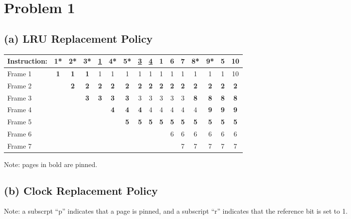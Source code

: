 \documentclass[a4paper, 12pt]{article}
\begin{document}
\section*{Problem 1}

\subsection*{(a) LRU Replacement Policy}

\begin{table}[h]
	\centering
	\begin{tabular}{l c c c c c c c c c c c c c c c}
		Instruction: & 1* & 2* & 3* & \underline{1} & 4* & 5* & \underline{3} &
		\underline{4} & 1 & 6 & 7 & 8* & 9* & 5 & 10 \\
		\hline
		Frame 1 & \textbf{1} & \textbf{1} & \textbf{1} & 1 & 1 & 1 & 1 & 1 & 1 &
		1 & 1 & 1 & 1 & 1 & 10 \\
		Frame 2 & & \textbf{2} & \textbf{2} & \textbf{2} & \textbf{2} &
		\textbf{2} & \textbf{2} & \textbf{2} & \textbf{2} & \textbf{2} &
		\textbf{2} & \textbf{2} & \textbf{2} & \textbf{2} & \textbf{2} \\
		Frame 3 & & & \textbf{3} & \textbf{3} & \textbf{3} & \textbf{3} & 3 & 3
		& 3 & 3 & 3 & \textbf{8} & \textbf{8} & \textbf{8} & \textbf{8} \\
		Frame 4 & & & & & \textbf{4} & \textbf{4} & \textbf{4} & 4 & 4 & 4 & 4 &
		4 & \textbf{9} & \textbf{9} & \textbf{9} \\
		Frame 5 & & & & & & \textbf{5} & \textbf{5} & \textbf{5} & \textbf{5} &
		\textbf{5} & \textbf{5} & \textbf{5} & \textbf{5} & \textbf{5} &
		\textbf{5} \\
		Frame 6 & & & & & & & & & & 6 & 6 & 6 & 6 & 6 & 6 \\
		Frame 7 & & & & & & & & & & & 7 & 7 & 7 & 7 & 7 \\
	\end{tabular}
\end{table}

Note: pages in bold are pinned.

\subsection*{(b) Clock Replacement Policy}
\centering

Note: a subscrpt ``p'' indicates that a page is pinned, and a subscript ``r''
indicates that the reference bit is set to 1.
\end{document}
